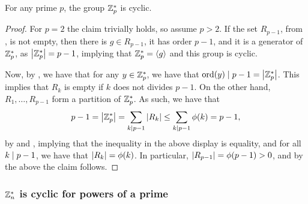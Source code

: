 \begin{lemma}
    For any prime $p$, the group $\mathbb{Z}_p^*$ is cyclic.
\end{lemma}
\begin{proof}
    For $p=2$ the claim trivially holds, so assume $p >2$.  If the set
    $R_{p-1}$, from , is not empty, then there is $g \in
    R_{p-1}$, it has order $p-1$, and it is a generator of $\mathbb{Z}_p^*$,
    as $\left| {\mathbb{Z}_p^*} \right| = p-1$, implying that $\mathbb{Z}_p^* = \left\langle {g} \right\rangle$
    and this group is cyclic.

    Now, by , we have that for any $y \in
    \mathbb{Z}_p^*$, we have that $\ordX{y} \divides p-1
    =\cardin{\ZZ_p^*}$. This implies that $R_k$ is empty if $k$ does
    not divides $p-1$. On the other hand, $R_1, \ldots, R_{p-1}$ form
    a partition of $\mathbb{Z}_p^*$. As such, we have that 
    \begin{align*}
        p-1 = \cardin{\ZZ_p^*}%
        =%
        \sum_{k \divides p-1} \cardin{R_k}%
        \leq%
        \sum_{k \divides p-1} \phi(k)%
        =%
        p-1,
    \end{align*}
    by  and , implying that the
    inequality in the above display is equality, and for all $k
    \mid p-1$, we have that $\left| {R_k} \right| = \phi(k)$. In
    particular, $\left| {R_{p-1}} \right| = \phi(p-1) > 0$, and by the above
    the claim follows.
\end{proof}


\subsubsection{$\mathbb{Z}_n^*$ is cyclic for powers of a prime}

